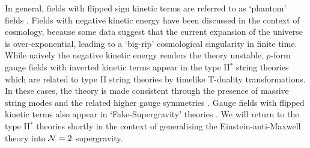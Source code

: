 In general, fields with flipped sign kinetic terms are referred to as `phantom' fields \cite{Sabra:2015vca, Taam:2015sia}. Fields with negative kinetic energy have been discussed in the context of cosmology, because some data suggest that the current expansion of the universe is over-exponential, leading to a `big-rip' cosmological singularity in finite time. While naively the negative kinetic energy renders the theory unstable, $p$-form gauge fields with inverted kinetic terms appear in the type II$^*$ string theories which are related to type II string theories by timelike T-duality transformations. In these cases, the theory is made consistent through the presence of massive string modes and the related higher gauge symmetries \cite{Hull:1998vg}. Gauge fields with flipped kinetic terms also appear in `Fake-Supergravity' theories \cite{Taam:2015sia, Townsend:2007nm}. We will return to the type II$^*$ theories shortly in the context of generalising the Einstein-anti-Maxwell theory into ${\cal N} = 2$ supergravity. 

